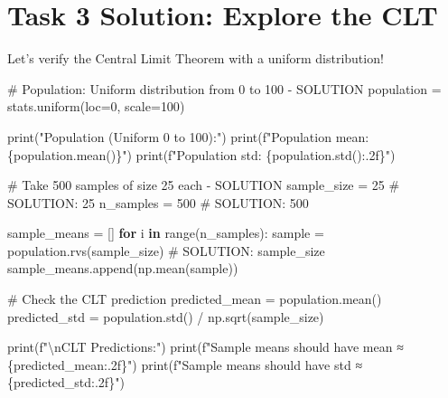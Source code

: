 \documentclass[
  letterpaper,
  DIV=11,
  numbers=noendperiod]{scrartcl}
\newenvironment{Shaded}{\begin{snugshade}}{\end{snugshade}}
\newcommand{\BuiltInTok}[1]{\textcolor[rgb]{0.00,0.23,0.31}{#1}}
\newcommand{\CharTok}[1]{\textcolor[rgb]{0.13,0.47,0.30}{#1}}
\newcommand{\CommentTok}[1]{\textcolor[rgb]{0.37,0.37,0.37}{#1}}
\newcommand{\ControlFlowTok}[1]{\textcolor[rgb]{0.00,0.23,0.31}{\textbf{#1}}}
\newcommand{\DecValTok}[1]{\textcolor[rgb]{0.68,0.00,0.00}{#1}}
\newcommand{\KeywordTok}[1]{\textcolor[rgb]{0.00,0.23,0.31}{\textbf{#1}}}
\newcommand{\NormalTok}[1]{\textcolor[rgb]{0.00,0.23,0.31}{#1}}
\newcommand{\OperatorTok}[1]{\textcolor[rgb]{0.37,0.37,0.37}{#1}}
\newcommand{\SpecialCharTok}[1]{\textcolor[rgb]{0.37,0.37,0.37}{#1}}
\newcommand{\SpecialStringTok}[1]{\textcolor[rgb]{0.13,0.47,0.30}{#1}}
\newcommand{\StringTok}[1]{\textcolor[rgb]{0.13,0.47,0.30}{#1}}
\begin{document}
\section{Task 3 Solution: Explore the
CLT}\label{task-3-solution-explore-the-clt}

Let's verify the Central Limit Theorem with a uniform distribution!

\begin{Shaded}
\begin{Highlighting}[]
\CommentTok{\# Population: Uniform distribution from 0 to 100 {-} SOLUTION}
\NormalTok{population }\OperatorTok{=}\NormalTok{ stats.uniform(loc}\OperatorTok{=}\DecValTok{0}\NormalTok{, scale}\OperatorTok{=}\DecValTok{100}\NormalTok{)}

\BuiltInTok{print}\NormalTok{(}\StringTok{"Population (Uniform 0 to 100):"}\NormalTok{)}
\BuiltInTok{print}\NormalTok{(}\SpecialStringTok{f"Population mean: }\SpecialCharTok{\{}\NormalTok{population}\SpecialCharTok{.}\NormalTok{mean()}\SpecialCharTok{\}}\SpecialStringTok{"}\NormalTok{)}
\BuiltInTok{print}\NormalTok{(}\SpecialStringTok{f"Population std: }\SpecialCharTok{\{}\NormalTok{population}\SpecialCharTok{.}\NormalTok{std()}\SpecialCharTok{:.2f\}}\SpecialStringTok{"}\NormalTok{)}

\CommentTok{\# Take 500 samples of size 25 each {-} SOLUTION}
\NormalTok{sample\_size }\OperatorTok{=} \DecValTok{25}   \CommentTok{\# SOLUTION: 25}
\NormalTok{n\_samples }\OperatorTok{=} \DecValTok{500}    \CommentTok{\# SOLUTION: 500}

\NormalTok{sample\_means }\OperatorTok{=}\NormalTok{ []}
\ControlFlowTok{for}\NormalTok{ i }\KeywordTok{in} \BuiltInTok{range}\NormalTok{(n\_samples):}
\NormalTok{    sample }\OperatorTok{=}\NormalTok{ population.rvs(sample\_size)  }\CommentTok{\# SOLUTION: sample\_size}
\NormalTok{    sample\_means.append(np.mean(sample))}

\CommentTok{\# Check the CLT prediction}
\NormalTok{predicted\_mean }\OperatorTok{=}\NormalTok{ population.mean()}
\NormalTok{predicted\_std }\OperatorTok{=}\NormalTok{ population.std() }\OperatorTok{/}\NormalTok{ np.sqrt(sample\_size)}

\BuiltInTok{print}\NormalTok{(}\SpecialStringTok{f"}\CharTok{\textbackslash{}n}\SpecialStringTok{CLT Predictions:"}\NormalTok{)}
\BuiltInTok{print}\NormalTok{(}\SpecialStringTok{f"Sample means should have mean ≈ }\SpecialCharTok{\{}\NormalTok{predicted\_mean}\SpecialCharTok{:.2f\}}\SpecialStringTok{"}\NormalTok{)}
\BuiltInTok{print}\NormalTok{(}\SpecialStringTok{f"Sample means should have std ≈ }\SpecialCharTok{\{}\NormalTok{predicted\_std}\SpecialCharTok{:.2f\}}\SpecialStringTok{"}\NormalTok{)}


\end{Highlighting}
\end{Shaded}
\end{document}
